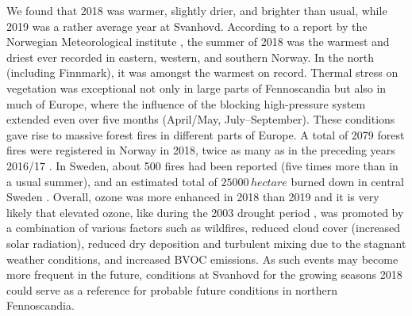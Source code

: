 \documentclass[bg, manuscript]{copernicus}
\begin{document}
We found that 2018 was warmer, slightly drier, and brighter than usual, while 2019 was a rather average year at Svanhovd. According to a report by the Norwegian Meteorological institute \citep{MetNOR2019}, the summer of 2018 was the warmest and driest ever recorded in eastern, western, and southern Norway. In the north (including Finnmark), it was amongst the warmest on record. Thermal stress on vegetation was exceptional not only in large parts of Fennoscandia but also in much of Europe, where the influence of the blocking high-pressure system extended even over five months (April/May, July--September). These conditions gave rise to massive forest fires in different parts of Europe. A total of 2079 forest fires were registered in Norway in 2018, twice as many as in the preceding years 2016/17 \citep[last accessed April 2020]{DSB2019}. In Sweden, about 500 fires had been reported (five times more than in a usual summer), and an estimated total of $25000\,\unit{hectare}$ burned down in central Sweden \citep{SOU2019}. Overall, ozone was more enhanced in 2018 than 2019 and it is very likely that elevated ozone, like during the 2003 drought period \citep{JGR:Solberg2018}, was promoted by a combination of various factors such as wildfires, reduced cloud cover (increased solar radiation), reduced dry deposition and turbulent mixing due to the stagnant weather conditions, and increased BVOC emissions. As such events may become more frequent in the future, conditions at Svanhovd for the growing seasons 2018 could serve as a reference for probable future conditions in northern Fennoscandia.
\end{document}
